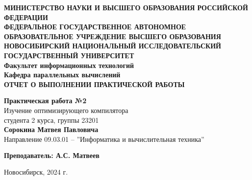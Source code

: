 \documentclass[12pt,a4paper]{article}
\numberwithin{subsection}{section}
\begin{document}
\begin{titlepage}
    \begin{center}
        \vspace*{2cm}
        {\Large \textbf{МИНИСТЕРСТВО НАУКИ И ВЫСШЕГО ОБРАЗОВАНИЯ РОССИЙСКОЙ ФЕДЕРАЦИИ}}\\
        \vspace{0.5cm}
        {\Large \textbf{ФЕДЕРАЛЬНОЕ ГОСУДАРСТВЕННОЕ АВТОНОМНОЕ ОБРАЗОВАТЕЛЬНОЕ УЧРЕЖДЕНИЕ ВЫСШЕГО ОБРАЗОВАНИЯ}}\\
        \vspace{0.5cm}
        {\Large \textbf{НОВОСИБИРСКИЙ НАЦИОНАЛЬНЫЙ ИССЛЕДОВАТЕЛЬСКИЙ ГОСУДАРСТВЕННЫЙ УНИВЕРСИТЕТ}}\\
        \vspace{0.5cm}
        {\large \textbf{Факультет информационных технологий}}\\
        \vspace{0.5cm}
        {\large \textbf{Кафедра параллельных вычислений}}\\
        \vspace{1cm}
         {\Large \textbf{ОТЧЕТ О ВЫПОЛНЕНИИ ПРАКТИЧЕСКОЙ РАБОТЫ}}
        \vspace{0.5cm}
        
        {\Large \textbf{Практическая работа №2}}\\
        \vspace{0.5cm}
         {\large Изучение оптимизирующего компилятора}\\
        \vspace{0.5cm}
        {\large студента 2 курса, группы 23201}\\
        \vspace{0.5cm}
        {\Large \textbf{Сорокина Матвея Павловича}}\\
        \vspace{1cm}
        {\large Направление 09.03.01 -- ''Информатика и вычислительная техника''}\\
        \vspace{2cm}
        
        \begin{flushright}
            \textbf{Преподаватель: А.С. Матвеев} \\
        \end{flushright}
        
        \vfill
        
        {\large Новосибирск, 2024 г.}
    \end{center}
\end{titlepage}
\end{document}
